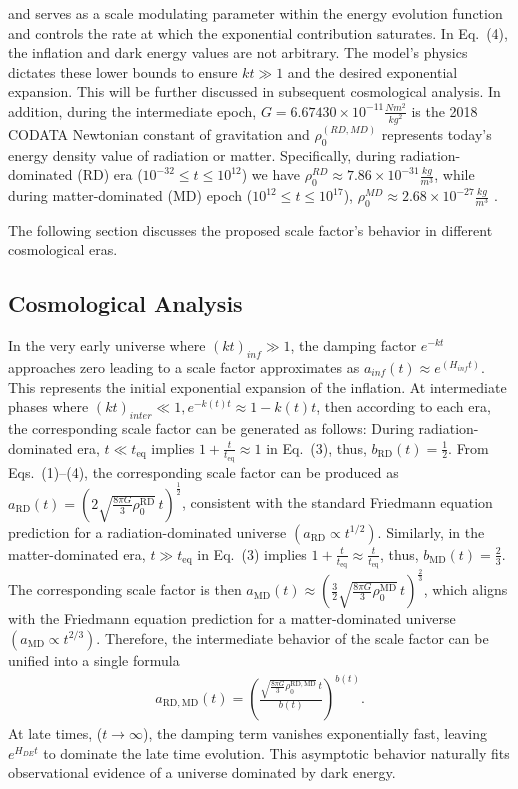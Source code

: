 \documentclass[12pt]{article}  %
\def\bea{\begin{eqnarray}}
\def\eea{\end{eqnarray}}
\begin{document}
and serves as a scale modulating parameter within the energy evolution function and controls the rate at which the exponential contribution saturates. In Eq.~(4), the inflation and dark energy values are not arbitrary. The model's physics dictates these lower bounds to ensure $kt\gg1$ and the desired exponential expansion. This will be further discussed in subsequent cosmological analysis. In addition, during the intermediate epoch, $G=6.67430  \times 10^{-11} \frac{N m^2}{kg^2}$ is the 2018 CODATA Newtonian constant of gravitation and  $\rho_{0}^{(RD,MD)}$ represents today's energy density value of radiation or matter. Specifically, during radiation-dominated (RD) era ($10^{-32} \leq t \leq 10^{12}$) we have $\rho_{0}^{RD}\approx 7.86 \times 10^{-31} \frac{kg}{m^{3}}$, while during matter-dominated (MD) epoch ($10^{12} \leq t \leq 10^{17}$), $ \rho_{0}^{MD}\approx 2.68 \times 10^{-27}  \frac{kg}{m^{3}}$  \cite{34}.

The following section discusses the proposed scale factor's behavior in different cosmological eras.

\subsection{ Cosmological Analysis }
	

In the very early universe where $(kt)_{inf}\gg1$, the damping factor $e^{-kt}$ approaches zero leading to a scale factor approximates as $ a_{inf} (t)  \approx e^{(H_{inf} t)}$. This represents the initial exponential expansion of the inflation. 
At intermediate phases where $(kt)_{inter}\ll1, e^{-k(t)t}\approx 1-k(t)t$, then according to each era, the corresponding scale factor can be generated as follows: 
During radiation-dominated era, $t \ll t_{\mathrm{eq}}$ implies $1 + \frac{t}{t_{\mathrm{eq}}} \approx 1 $  in Eq.~(3), thus, $b_{\mathrm{RD}}(t) = \frac{1}{2}$. From Eqs.~(1)--(4), the corresponding scale factor can be produced as $a_{\mathrm{RD}}(t) = \left( 2 \sqrt{\frac{8 \pi G}{3} \rho_0^{\mathrm{RD}}} \, t \right)^{\frac{1}{2}}$,
consistent with the standard Friedmann equation prediction for a radiation-dominated universe $\left(a_{\mathrm{RD}} \propto t^{1/2}\right)$. 
Similarly, in the matter-dominated era, $ t \gg t_{\mathrm{eq}} $ in Eq.~(3) implies $ 1 + \frac{t}{t_{\mathrm{eq}}} \approx \frac{t}{t_{\mathrm{eq}}} $, thus, $b_{\mathrm{MD
}}(t) = \frac{2}{3}$.
The corresponding scale factor is then $a_{\mathrm{MD}}(t) \approx \left( \frac{3}{2} \sqrt{\frac{8 \pi G}{3} \rho_0^{\mathrm{MD}}} \, t \right)^{\frac{2}{3}}$,
which aligns with the Friedmann equation prediction for a matter-dominated universe $\left(a_{\mathrm{MD}} \propto t^{2/3}\right)$. Therefore, the intermediate behavior of the scale factor can be unified into a single formula 
\bea
a_{\mathrm{RD,MD}}(t) = \left( \frac{\sqrt{\frac{8 \pi G}{3} \rho_0^{\mathrm{RD,MD}}} \, t}{b(t)} \right)^{b(t)}.
\eea
At late times, ($t\rightarrow \infty$), the damping term vanishes exponentially fast, leaving $e^{H_{DE} t}$ to dominate the late time evolution. This asymptotic behavior naturally fits observational evidence of a universe dominated by dark energy.
\end{document}
